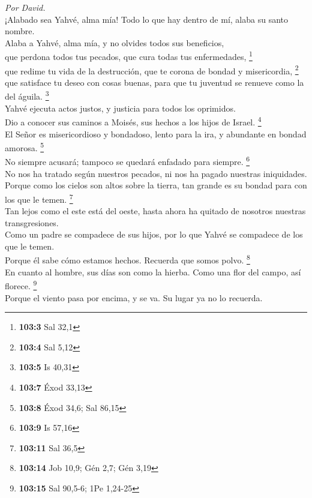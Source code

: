 \emph{Por David.}\\
 ¡Alabado sea Yahvé, alma mía! Todo lo que hay dentro de
mí, alaba su santo nombre.\\
 Alaba a Yahvé, alma mía, y no olvides todos sus
beneficios,\\
 que perdona todos tus pecados, que cura todas tus
enfermedades, \footnote{\textbf{103:3} Sal 32,1}\\
 que redime tu vida de la destrucción, que te corona de
bondad y misericordia, \footnote{\textbf{103:4} Sal 5,12}\\
 que satisface tu deseo con cosas buenas, para que tu
juventud se renueve como la del águila. \footnote{\textbf{103:5} Is
  40,31}\\
 Yahvé ejecuta actos justos, y justicia para todos los
oprimidos.\\
 Dio a conocer sus caminos a Moisés, sus hechos a los
hijos de Israel. \footnote{\textbf{103:7} Éxod 33,13}\\
 El Señor es misericordioso y bondadoso, lento para la
ira, y abundante en bondad amorosa. \footnote{\textbf{103:8} Éxod 34,6;
  Sal 86,15}\\
 No siempre acusará; tampoco se quedará enfadado para
siempre. \footnote{\textbf{103:9} Is 57,16}\\
 No nos ha tratado según nuestros pecados, ni nos ha
pagado nuestras iniquidades.\\
 Porque como los cielos son altos sobre la tierra, tan
grande es su bondad para con los que le temen. \footnote{\textbf{103:11}
  Sal 36,5}\\
 Tan lejos como el este está del oeste, hasta ahora ha
quitado de nosotros nuestras transgresiones.\\
 Como un padre se compadece de sus hijos, por lo que
Yahvé se compadece de los que le temen.\\
 Porque él sabe cómo estamos hechos. Recuerda que somos
polvo. \footnote{\textbf{103:14} Job 10,9; Gén 2,7; Gén 3,19}\\
 En cuanto al hombre, sus días son como la hierba. Como
una flor del campo, así florece. \footnote{\textbf{103:15} Sal 90,5-6;
  1Pe 1,24-25}\\
 Porque el viento pasa por encima, y se va. Su lugar ya
no lo recuerda.\\
